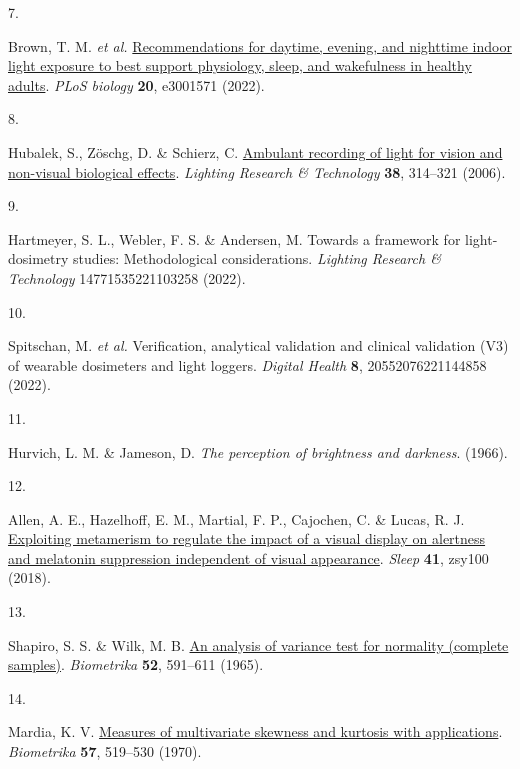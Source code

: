 \documentclass[
  man]{apa6}
\newlength{\cslhangindent}
\newlength{\csllabelwidth}
\newlength{\cslentryspacingunit} %
\newenvironment{CSLReferences}[2] %
 {%
  \setlength{\parindent}{0pt}
  \ifodd #1
  \let\oldpar\par
  \def\par{\hangindent=\cslhangindent\oldpar}
  \fi
  \setlength{\parskip}{#2\cslentryspacingunit}
 }%
 {}
\newcommand{\CSLLeftMargin}[1]{\parbox[t]{\csllabelwidth}{#1}}
\newcommand{\CSLRightInline}[1]{\parbox[t]{\linewidth - \csllabelwidth}{#1}\break}
\begin{document}
\begin{CSLReferences}{0}{0}
\leavevmode{}%
\CSLLeftMargin{7. }%
\CSLRightInline{Brown, T. M. \emph{et al.} \href{https://doi.org/10.1371/journal.pbio.3001571}{Recommendations for daytime, evening, and nighttime indoor light exposure to best support physiology, sleep, and wakefulness in healthy adults}. \emph{PLoS biology} \textbf{20}, e3001571 (2022).}

\leavevmode{}%
\CSLLeftMargin{8. }%
\CSLRightInline{Hubalek, S., Zöschg, D. \& Schierz, C. \href{https://doi.org/10.1177/1477153506070687}{Ambulant recording of light for vision and non-visual biological effects}. \emph{Lighting Research \& Technology} \textbf{38}, 314--321 (2006).}

\leavevmode{}%
\CSLLeftMargin{9. }%
\CSLRightInline{Hartmeyer, S. L., Webler, F. S. \& Andersen, M. Towards a framework for light-dosimetry studies: Methodological considerations. \emph{Lighting Research \& Technology} 14771535221103258 (2022).}

\leavevmode{}%
\CSLLeftMargin{10. }%
\CSLRightInline{Spitschan, M. \emph{et al.} Verification, analytical validation and clinical validation (V3) of wearable dosimeters and light loggers. \emph{Digital Health} \textbf{8}, 20552076221144858 (2022).}

\leavevmode{}%
\CSLLeftMargin{11. }%
\CSLRightInline{Hurvich, L. M. \& Jameson, D. \emph{The perception of brightness and darkness}. (1966).}

\leavevmode{}%
\CSLLeftMargin{12. }%
\CSLRightInline{Allen, A. E., Hazelhoff, E. M., Martial, F. P., Cajochen, C. \& Lucas, R. J. \href{https://doi.org/10.1093/sleep/zsy100}{Exploiting metamerism to regulate the impact of a visual display on alertness and melatonin suppression independent of visual appearance}. \emph{Sleep} \textbf{41}, zsy100 (2018).}

\leavevmode{}%
\CSLLeftMargin{13. }%
\CSLRightInline{Shapiro, S. S. \& Wilk, M. B. \href{https://doi.org/10.1093/biomet/52.3-4.591}{An analysis of variance test for normality (complete samples)}. \emph{Biometrika} \textbf{52}, 591--611 (1965).}

\leavevmode{}%
\CSLLeftMargin{14. }%
\CSLRightInline{Mardia, K. V. \href{https://doi.org/10.1093/biomet/57.3.519}{Measures of multivariate skewness and kurtosis with applications}. \emph{Biometrika} \textbf{57}, 519--530 (1970).}


\end{CSLReferences}
\end{document}
